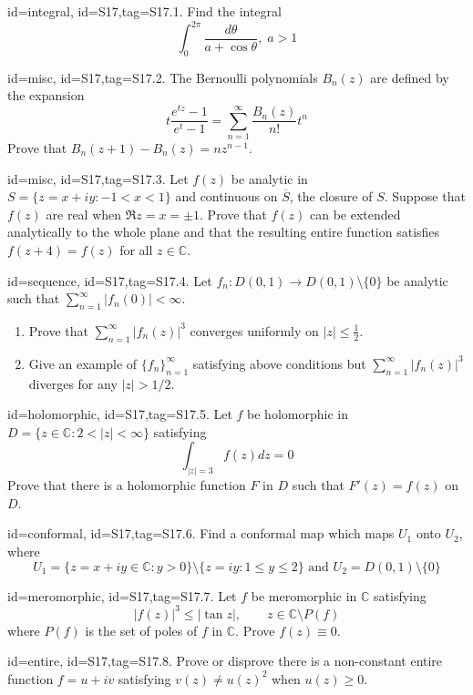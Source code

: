 \documentclass[12pt,letterpaper]{article}
\begin{document}
{\item[id=integral, id=S17,tag=S17.1.]
Find the integral
\[
	\int_{0}^{2\pi} \frac{d\theta}{a + \cos \theta}, \; a > 1
\]
\item[id=misc, id=S17,tag=S17.2.]
The Bernoulli polynomials $B_n(z)$ are defined by the expansion
\[
	t \frac{e^{tz} - 1}{e^t -1} = \sum_{n=1}^{\infty} \frac{B_n(z)}{n!} t^{n}
\]
Prove that $B_n(z+1) - B_n(z) = nz^{n-1}$.
\item[id=misc, id=S17,tag=S17.3.]
Let $f(z)$ be analytic in $S = \{z = x + iy \colon -1 < x < 1\}$ and continuous on $\overline{S}$, the closure of $S$. Suppose that $f(z)$ are real when $\Re z = x = \pm 1$. Prove that $f(z)$ can be extended analytically to the whole plane and that the resulting entire function satisfies $f(z+4) = f(z)$ for all $z \in \mathbb{C}$.
\item[id=sequence, id=S17,tag=S17.4.]
Let $f_n : D(0,1) \rightarrow D(0,1) \setminus \{0\}$ be analytic such that $\sum_{n=1}^{\infty} | f_n(0) | < \infty$.
\begin{enumerate}[label=(\alph*)]\onlyitems
\item Prove that $\sum_{n=1}^{\infty} | f_n(z) |^3$ converges uniformly on $| z | \le \frac{1}{2}$.
\item Give an example of $\{f_n\}_{n=1}^{\infty}$ satisfying above conditions but $\sum_{n=1}^{\infty} | f_n(z) |^3$ diverges for any $| z | > 1/2$.
\end{enumerate}
\item[id=holomorphic, id=S17,tag=S17.5.]
Let $f$ be holomorphic in $D = \{z \in \mathbb{C} \colon 2 < | z | < \infty\}$ satisfying
\[
 	\int_{| z | = 3} f(z) dz = 0
 \] 
 Prove that there is a holomorphic function $F$ in $D$ such that $F'(z) = f(z)$ on $D$.
\item[id=conformal, id=S17,tag=S17.6.]
Find a conformal map which maps $U_1$ onto $U_2$, where
\[
	U_1 = \{z = x + iy \in \mathbb{C} \colon y > 0\} \setminus \{z = iy \colon 1 \le y \le 2\} \text{ and } U_2 = D(0,1) \setminus \{0\}
\]
\item[id=meromorphic, id=S17,tag=S17.7.]
Let $f$ be meromorphic in $\mathbb{C}$ satisfying
\[
	| f(z) |^3 \le | \tan z |, \qquad z \in \mathbb{C} \setminus P(f)
\]
where $P(f)$ is the set of poles of $f$ in $\mathbb{C}$. Prove $f(z) \equiv 0$.
\item[id=entire, id=S17,tag=S17.8.]
Prove or disprove there is a non-constant entire function $f = u+ iv$ satisfying $v(z) \ne u(z)^2$ when $u(z) \ge 0$.

}
\end{document}
